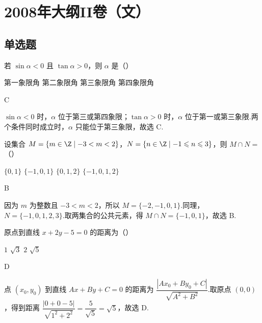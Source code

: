 \chapter{2008年大纲II卷（文）}

\section{单选题}

\begin{problem}
若 \(\sin \alpha < 0\) 且 \(\tan \alpha > 0\)，则 \(\alpha\) 是（\quad）

\choices
    {第一象限角}
    {第二象限角}
    {第三象限角}
    {第四象限角}
\end{problem}

\begin{answer}
C
\end{answer}

\begin{solution}
\(\sin\alpha<0\) 时，\(\alpha\) 位于第三或第四象限；\(\tan\alpha>0\) 时，\(\alpha\) 位于第一或第三象限.两个条件同时成立时，\(\alpha\) 只能位于第三象限，故选 C.
\end{solution}

\begin{problem}
设集合 \(M = \{m \in \Z \mid -3 < m < 2\}\)，\(N = \{n \in \Z \mid -1 \leqslant n \leqslant 3\}\)，则 \(M \cap N =\)（\quad）

\choices
    {\(\{0,1\}\)}
    {\(\{-1,0,1\}\)}
    {\(\{0,1,2\}\)}
    {\(\{-1,0,1,2\}\)}
\end{problem}

\begin{answer}
B
\end{answer}

\begin{solution}
因为 \(m\) 为整数且 \(-3<m<2\)，所以 \(M=\{-2,-1,0,1\}\).同理，\(N=\{-1,0,1,2,3\}\).取两集合的公共元素，得 \(M\cap N=\{-1,0,1\}\)，故选 B.
\end{solution}

\begin{problem}
原点到直线 \(x + 2y - 5 = 0\) 的距离为（\quad）

\choices
    {\(1\)}
    {\(\sqrt{3}\)}
    {\(2\)}
    {\(\sqrt{5}\)}
\end{problem}

\begin{answer}
D
\end{answer}

\begin{solution}
点 \((x_0,y_0)\) 到直线 \(Ax+By+C=0\) 的距离为 \(\dfrac{|Ax_0+By_0+C|}{\sqrt{A^2+B^2}}\).取原点 \((0,0)\)，得到距离
\(\dfrac{|0+0-5|}{\sqrt{1^2+2^2}}=\dfrac{5}{\sqrt{5}}=\sqrt{5}\)，故选 D.
\end{solution}

